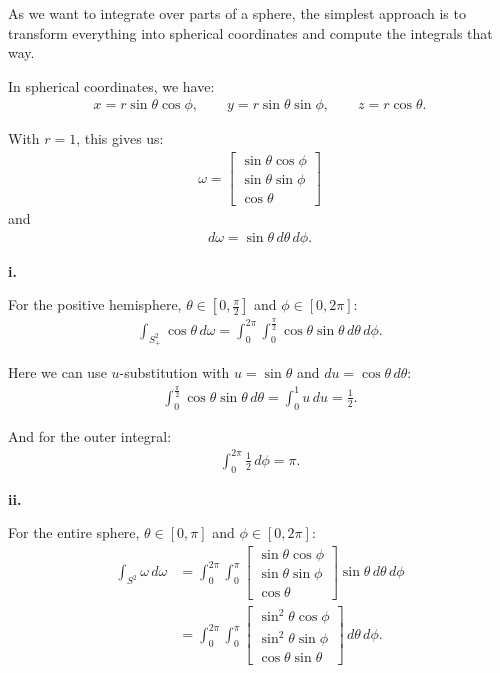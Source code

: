 
As we want to integrate over parts of a sphere, the simplest approach is to transform everything into spherical coordinates and compute the integrals that way.

In spherical coordinates, we have:
\begin{gather*}
x = r\sin\theta\cos\phi, \qquad
y = r\sin\theta\sin\phi, \qquad
z = r\cos\theta.
\end{gather*}

With $r=1$, this gives us:
\begin{gather*}
\omega =
\begin{bmatrix}
\sin\theta\cos\phi \\
\sin\theta\sin\phi \\
\cos\theta
\end{bmatrix}
\end{gather*}
and
\begin{gather*}
d\omega = \sin\theta \, d\theta \, d\phi.
\end{gather*}

\textbf{i.}

For the positive hemisphere, $\theta \in [0,\frac{\pi}{2}]$ and $\phi \in [0,2\pi]$:
\begin{gather*}
\int_{S^2_+} \cos\theta \, d\omega
= \int_{0}^{2\pi} \int_{0}^{\frac{\pi}{2}}
\cos\theta\sin\theta \, d\theta \, d\phi.
\end{gather*}

Here we can use $u$-substitution with $u=\sin\theta$ and $du=\cos\theta\,d\theta$:
\begin{gather*}
\int_{0}^{\frac{\pi}{2}} \cos\theta\sin\theta \, d\theta
= \int_{0}^{1} u \, du
= \frac{1}{2}.
\end{gather*}

And for the outer integral:
\begin{gather*}
\int_{0}^{2\pi} \frac{1}{2} \, d\phi = \pi.
\end{gather*}

\textbf{ii.}

For the entire sphere, $\theta \in [0,\pi]$ and $\phi \in [0,2\pi]$:
\begin{align*}
\int_{S^2} \omega \, d\omega
&= \int_{0}^{2\pi} \int_{0}^{\pi}
\begin{bmatrix}
\sin\theta\cos\phi \\
\sin\theta\sin\phi \\
\cos\theta
\end{bmatrix}
\sin\theta \, d\theta \, d\phi \\
&= \int_{0}^{2\pi} \int_{0}^{\pi}
\begin{bmatrix}
\sin^2\theta\cos\phi \\
\sin^2\theta\sin\phi \\
\cos\theta\sin\theta
\end{bmatrix}
\, d\theta \, d\phi.
\end{align*}

